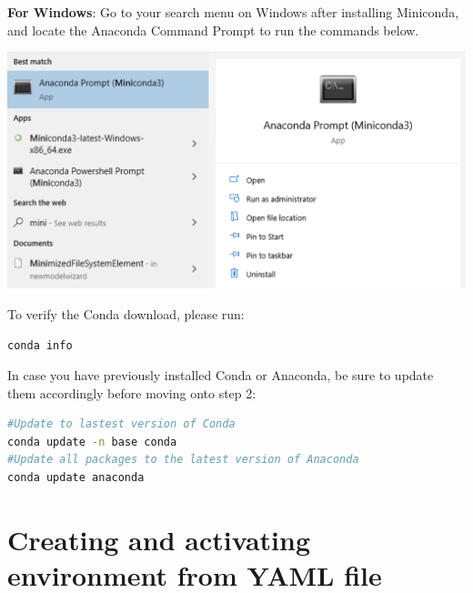 \documentclass{article}
\begin{document}
\textbf{For Windows}: Go to your search menu on Windows after installing Miniconda, and locate the Anaconda Command Prompt to run the commands below.
\begin{center}
   \includegraphics[scale=0.5]{acp.png} 
\end{center}


To verify the Conda download, please run: 
\begin{lstlisting}[language=bash] 
conda info
\end{lstlisting}
In case you have previously installed Conda or Anaconda, be sure to update them accordingly before moving onto step 2:
\begin{lstlisting}[language=bash] 
#Update to lastest version of Conda
conda update -n base conda
#Update all packages to the latest version of Anaconda
conda update anaconda
\end{lstlisting}

\section{Creating and activating environment from YAML file}
\end{document}
